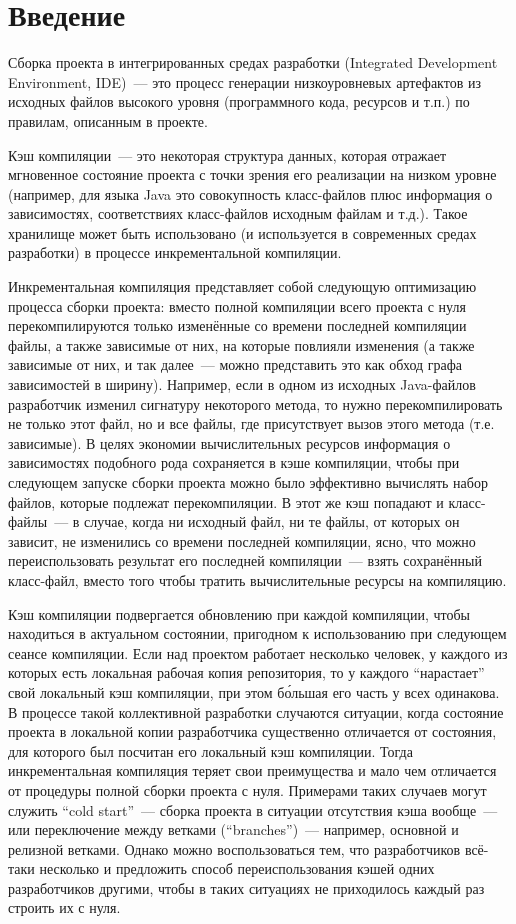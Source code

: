 %

%

\section{Введение}
Сборка проекта в интегрированных средах разработки (Integrated Development Environment, IDE)~--- это процесс генерации низкоуровневых артефактов из исходных файлов высокого уровня (программного кода, ресурсов и т.п.) по правилам, описанным в проекте.

Кэш компиляции~--- это некоторая структура данных, которая отражает мгновенное состояние проекта с точки зрения его реализации на низком уровне (например, для языка Java это совокупность класс-файлов плюс информация о зависимостях, соответствиях класс-файлов исходным файлам и т.д.). Такое хранилище может быть использовано (и используется в современных средах разработки) в процессе инкрементальной компиляции.

Инкрементальная компиляция представляет собой следующую оптимизацию процесса сборки проекта: вместо полной компиляции всего проекта с нуля перекомпилируются только изменённые со времени последней компиляции файлы, а также зависимые от них, на которые повлияли изменения (а также зависимые от них, и так далее~--- можно представить это как обход графа зависимостей в ширину). Например, если в одном из исходных Java-файлов разработчик изменил сигнатуру некоторого метода, то нужно перекомпилировать не только этот файл, но и все файлы, где присутствует вызов этого метода (т.е. зависимые). В целях экономии вычислительных ресурсов информация о зависимостях подобного рода сохраняется в кэше компиляции, чтобы при следующем запуске сборки проекта можно было эффективно вычислять набор файлов, которые подлежат перекомпиляции. В этот же кэш попадают и класс-файлы~--- в случае, когда ни исходный файл, ни те файлы, от которых он зависит, не изменились со времени последней компиляции, ясно, что можно переиспользовать результат его последней компиляции~--- взять сохранённый класс-файл, вместо того чтобы тратить вычислительные ресурсы на компиляцию.

Кэш компиляции подвергается обновлению при каждой компиляции, чтобы находиться в актуальном состоянии, пригодном к использованию при следующем сеансе компиляции. Если над проектом работает несколько человек, у каждого из которых есть локальная рабочая копия репозитория, то у каждого ``нарастает'' свой локальный кэш компиляции, при этом б\'{о}льшая его часть у всех одинакова. В процессе такой коллективной разработки случаются ситуации, когда состояние проекта в локальной копии разработчика существенно отличается от состояния, для которого был посчитан его локальный кэш компиляции. Тогда инкрементальная компиляция теряет свои преимущества и мало чем отличается от процедуры полной сборки проекта с нуля. Примерами таких случаев могут служить ``cold start''~--- сборка проекта в ситуации отсутствия кэша вообще~--- или переключение между ветками (``branches'')~--- например, основной и релизной ветками. Однако можно воспользоваться тем, что разработчиков всё-таки несколько и предложить способ переиспользования кэшей одних разработчиков другими, чтобы в таких ситуациях не приходилось каждый раз строить их с нуля.

